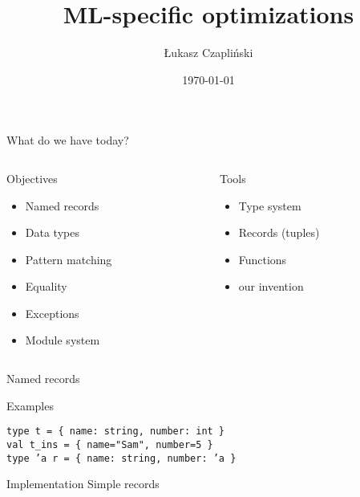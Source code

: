 \documentclass[presentation]{beamer}
\date{\today}
\title{ML-specific optimizations}
\author{Łukasz Czapliński}
\begin{document}
\maketitle

\begin{frame}{What do we have today?}
  \begin{columns}[T]
    \begin{column}{.48\textwidth}
      \begin{block}{Objectives}
        \begin{itemize}
        \item Named records
        \item Data types
        \item Pattern matching
        \item Equality
        \item Exceptions
        \item Module system
        \end{itemize}
      \end{block}
    \end{column}
    \begin{column}{.48\textwidth}
      \begin{block}{Tools}
        \begin{itemize}
        \item Type system
        \item Records (tuples)
        \item Functions
        \item our invention
        \end{itemize}
      \end{block}
    \end{column}
  \end{columns}
\end{frame}

\begin{frame}[fragile]{Named records}
  \begin{block}{Examples}
\begin{verbatim}
type t = { name: string, number: int }
val t_ins = { name="Sam", number=5 }
type ’a r = { name: string, number: ’a }
\end{verbatim}
  \end{block}
  \pause
  \begin{block}{Implementation}
  \pause
    Simple records
  \end{block}
\end{frame}
\end{document}
